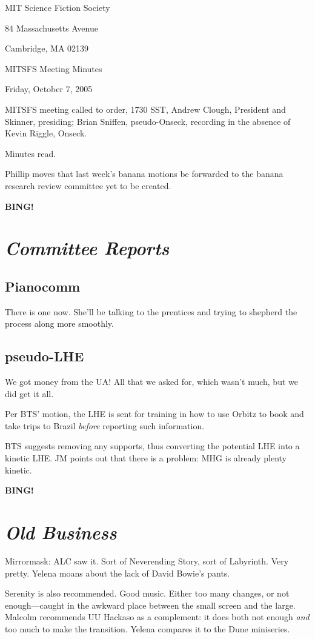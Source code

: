 \documentclass[10pt]{article}
\newcommand{\bing}{{\bf BING!} }
\newcommand{\goto}[1]{\bing \vskip 12pt \section*{{\em{#1}}}}
\begin{document}
\begin{center}

MIT Science Fiction Society

84 Massachusetts Avenue

Cambridge, MA 02139

\vspace{12pt}

MITSFS Meeting Minutes

Friday, October 7, 2005

\end{center}

\vspace{18pt}

\setlength{\parskip}{6pt}

\noindent
MITSFS meeting called to order, 1730 SST, Andrew Clough, President and
Skinner, presiding; Brian Sniffen, pseudo-Onseck, recording in the
absence of Kevin Riggle, Onseck.

Minutes read.

Phillip moves that last week's banana motions be forwarded to the
banana research review committee yet to be created.

\goto{Committee Reports}
\subsection*{Pianocomm}
There is one now.  She'll be talking to the prentices and trying to
shepherd the process along more smoothly.

\subsection*{pseudo-LHE}
We got money from the UA!  All that we asked for, which wasn't much,
but we did get it all.

Per BTS' motion, the LHE is sent for training in how to use Orbitz to
book and take trips to Brazil \emph{before} reporting such
information.

BTS suggests removing any supports, thus converting the potential LHE
into a kinetic LHE.  JM points out that there is a problem: MHG is
already plenty kinetic.

\goto{Old Business}

Mirrormask: ALC saw it.  Sort of Neverending Story, sort of
Labyrinth.  Very pretty.  Yelena moans about the lack of David Bowie's
pants.

Serenity is also recommended.  Good music.  Either too many changes,
or not enough---caught in the awkward place between the small screen
and the large.  Malcolm recommends UU Hackaso as a complement: it does
both not enough \emph{and} too much to make the transition.  Yelena
compares it to the Dune miniseries.
\end{document}
